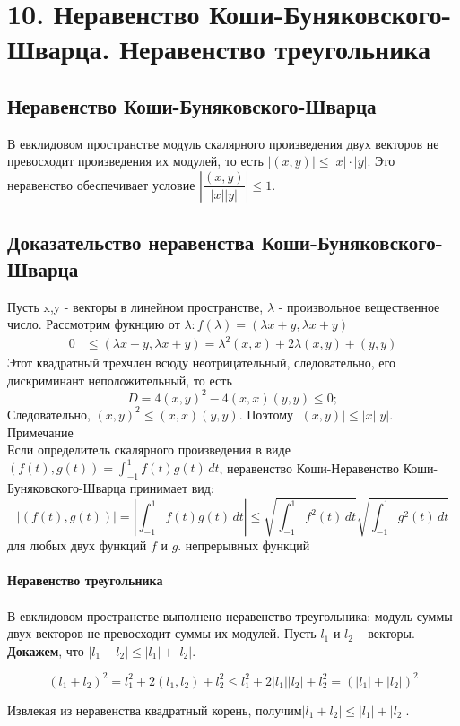 \documentclass[12pt]{article}
\begin{document}
\section{10. Неравенство Коши-Буняковского-Шварца. Неравенство треугольника}
\subsection{Неравенство Коши-Буняковского-Шварца}
В евклидовом пространстве модуль скалярного произведения двух векторов не превосходит произведения их модулей, то есть  $|(x,y)| \leq |x| \cdot |y|$.  Это неравенство обеспечивает условие $\left|\dfrac{(x,y)}{|x||y|}\right| \leq 1$.

\subsection{Доказательство неравенства Коши-Буняковского-Шварца}
Пусть x,y - векторы в линейном пространстве, $\lambda$  - произвольное вещественное число. Рассмотрим фукнцию от $\lambda: f(\lambda)=(\lambda x+y,\lambda x+y)$
\begin{align*}
    0 & \leq (\lambda x + y, \lambda x + y)= \lambda^2 (x,x) + 2\lambda (x,y) + (y,y)
\end{align*}
Этот квадратный трехчлен всюду неотрицательный, следовательно, его дискриминант неположительный, то есть
$$D=4(x,y)^2-4(x,x)(y,y)\leq0;$$
Следовательно, $(x,y)^2\leq(x,x)(y,y)$.
Поэтому $|(x,y)| \leq |x||y|$.\\
Примечание \\
Если определитель скалярного произведения в виде $(f(t),g(t))=\int_{-1}^{1} f(t)g(t) \,dt$, неравенство Коши-Неравенство Коши-Буняковского-Шварца принимает вид:
$$|(f(t),g(t))|=|\int_{-1}^{1} f(t)g(t)\,dt| \leq \sqrt{\int_{-1}^{1} f^2(t)\,dt} \sqrt{\int_{-1}^{1} g^2(t)\,dt}$$
для любых двух функций $f$ и $g$. непрерывных функций\\
\\
\textbf{Неравенство треугольника}\\
\\
В евклидовом пространстве выполнено неравенство треугольника: модуль суммы двух векторов не
превосходит суммы их модулей.
Пусть $l_1$ и $l_2$ – векторы.\\
\textbf{Докажем}, что $|l_1 + l_2| \leq |l_1|+|l_2|$.

$$(l_1+l_2)^2=l_1^2+2(l_1,l_2)+l_2^2 \leq l_1^2+2|l_1||l_2|+l_2^2=(|l_1|+|l_2|)^2$$

Извлекая из неравенства квадратный корень, получим$|l_1+l_2|\leq|l_1|+|l_2|$.
\end{document}
